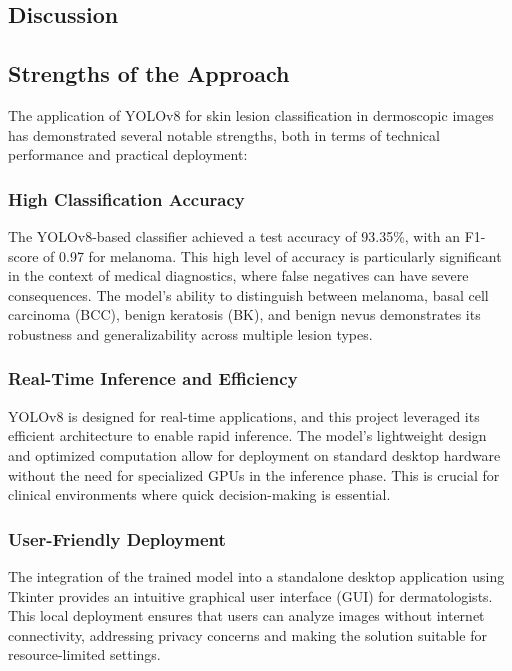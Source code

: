 \documentclass[a4paper,12pt]{report}
\begin{document}
\begin{spacing}{1.5}
\chapter{Discussion}

    \section{Strengths of the Approach}
    
    The application of YOLOv8 for skin lesion classification in dermoscopic images has demonstrated several notable strengths, both in terms of technical performance and practical deployment:
    
        \subsection*{High Classification Accuracy}
        The YOLOv8-based classifier achieved a test accuracy of 93.35\%, with an F1-score of 0.97 for melanoma. This high level of accuracy is particularly significant in the context of medical diagnostics, where false negatives can have severe consequences. The model’s ability to distinguish between melanoma, basal cell carcinoma (BCC), benign keratosis (BK), and benign nevus demonstrates its robustness and generalizability across multiple lesion types.
        
        \subsection*{Real-Time Inference and Efficiency}
        YOLOv8 is designed for real-time applications, and this project leveraged its efficient architecture to enable rapid inference. The model’s lightweight design and optimized computation allow for deployment on standard desktop hardware without the need for specialized GPUs in the inference phase. This is crucial for clinical environments where quick decision-making is essential.
        
        \subsection*{User-Friendly Deployment}
        The integration of the trained model into a standalone desktop application using Tkinter provides an intuitive graphical user interface (GUI) for dermatologists. This local deployment ensures that users can analyze images without internet connectivity, addressing privacy concerns and making the solution suitable for resource-limited settings.
        

\end{spacing}
\end{document}
